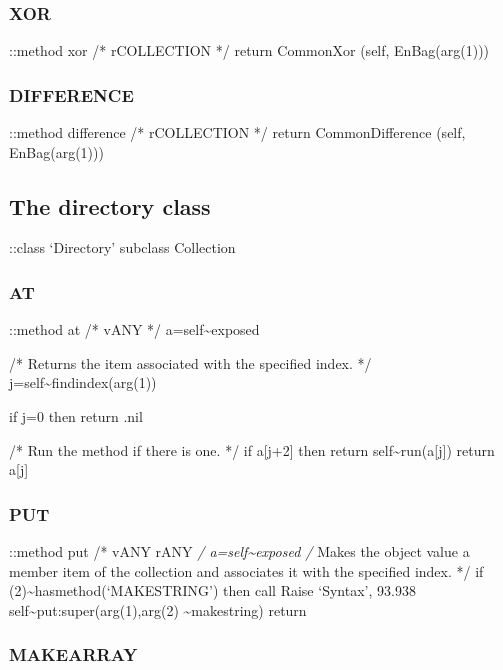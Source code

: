 \hypertarget{xor-3}{%
\subsubsection{XOR}\label{xor-3}}

::method xor /* rCOLLECTION */ return CommonXor (self, EnBag(arg(1)))

\hypertarget{difference-3}{%
\subsubsection{DIFFERENCE}\label{difference-3}}

::method difference /* rCOLLECTION */ return CommonDifference (self,
EnBag(arg(1)))

\hypertarget{the-directory-class}{%
\subsection{The directory class}\label{the-directory-class}}

::class `Directory' subclass Collection

\hypertarget{at-1}{%
\subsubsection{AT}\label{at-1}}

::method at /* vANY */ a=self\textasciitilde exposed

/* Returns the item associated with the specified index. */
j=self\textasciitilde findindex(arg(1))

if j=0 then return .nil

/* Run the method if there is one. */ if a{[}j+2{]} then return
self\textasciitilde run(a{[}j{]}) return a{[}j{]}

\hypertarget{put-5}{%
\subsubsection{PUT}\label{put-5}}

::method put /* vANY rANY \emph{/ a=self\textasciitilde exposed /} Makes
the object value a member item of the collection and associates it with
the specified index. */ if
\arg(2)\textasciitilde hasmethod(`MAKESTRING') then call Raise `Syntax',
93.938 self\textasciitilde put:super(arg(1),arg(2)
\textasciitilde makestring) return

\hypertarget{makearray-2}{%
\subsubsection{MAKEARRAY}\label{makearray-2}}


